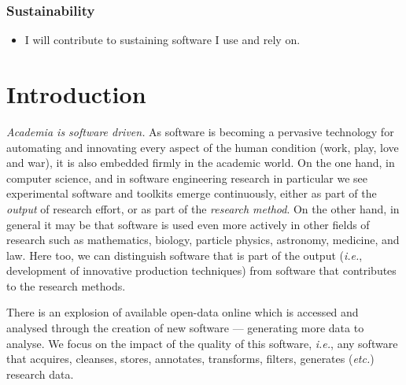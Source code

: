 \documentclass[a4paper,UKenglish]{dagman}
\renewcommand{\paragraph}[1]{\subsubsection*{#1}\xspace}
\newcommand{\ie}{\emph{i.e.},\xspace}
\newcommand{\etc}{\emph{etc.}\xspace}
\begin{document}
\paragraph{Sustainability}
\begin{itemize}
\item I will contribute to sustaining software I use and rely on. 

\end{itemize}



\tableofcontents

\section{Introduction}

\emph{Academia is software driven.} As software is becoming a pervasive technology for automating and innovating every aspect of the human condition (work, play, love and war), it is also embedded firmly in the academic world. On the one hand, in computer science, and in software engineering research in particular we see experimental software and toolkits emerge continuously, either as part of the \emph{output} of research effort, or as part of the \emph{research method}. On the other hand, in general it may be that software is used even more actively in other fields of research such as mathematics, biology, particle physics, astronomy, medicine, and law. Here too, we can distinguish software that is part of the output (\ie development of innovative production techniques) from software that contributes to the research methods. 

There is an explosion of available open-data online which is accessed and analysed through the creation of new software --- generating more data to analyse. We focus on the impact of the quality of this software, \ie any software that acquires, cleanses, stores, annotates, transforms, filters, generates (\etc) research data.
\end{document}
